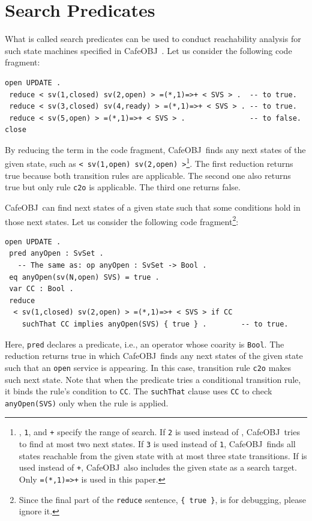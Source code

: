 \documentclass[12pt]{report}
\newcommand{\stt}[1]{{\small{\tt {#1}}}}
\newcommand{\cafeobj}{{\sf CafeOBJ}~}
\begin{document}
\section{Search Predicates}
\label{sec:searchpredicate}
What is called search predicates can be used to conduct
reachability analysis for such state machines specified in
\cafeobj. Let us consider the following code fragment:
\begin{verbatim}
open UPDATE .
 reduce < sv(1,closed) sv(2,open) > =(*,1)=>+ < SVS > .  -- to true.
 reduce < sv(3,closed) sv(4,ready) > =(*,1)=>+ < SVS > . -- to true.
 reduce < sv(5,open) > =(*,1)=>+ < SVS > .               -- to false.
close
\end{verbatim}
By reducing the term in the code fragment, \cafeobj finds any next
states of the given state, such as
\stt{<~sv(1,open)~sv(2,open)~>}\footnote{{\tt *}, {\tt 1}, and {\tt +}
  specify the range of search. If {\tt 2} is used instead of {\tt *},
  \cafeobj tries to find at most two next states. If {\tt 3} is used
  instead of {\tt 1}, \cafeobj finds all states reachable from the
  given state with at most three state transitions. If {\tt *} is used
  instead of {\tt +}, \cafeobj also includes the given state as a
  search target.  Only \stt{=(*,1)=>+} is used in this paper.}.  The
first reduction returns true because both transition rules are
applicable.  The second one also returns true but only rule {\tt c2o}
is applicable. The third one returns false.

\cafeobj can find next states of a given state such that some
conditions hold in those next states. Let us consider the following
code fragment\footnote{Since the final part of the {\tt reduce} sentence,
  {\tt \{~true~\}}, is for debugging, please ignore it.}:
\begin{verbatim}
open UPDATE .
 pred anyOpen : SvSet .
   -- The same as: op anyOpen : SvSet -> Bool .
 eq anyOpen(sv(N,open) SVS) = true .
 var CC : Bool .
 reduce 
  < sv(1,closed) sv(2,open) > =(*,1)=>+ < SVS > if CC
    suchThat CC implies anyOpen(SVS) { true } .        -- to true.
\end{verbatim}
Here, {\tt pred} declares a predicate, i.e., an operator whose coarity
is {\tt Bool}.  The reduction returns true in which \cafeobj finds any
next states of the given state such that an {\tt open} service is
appearing. In this case, transition rule {\tt c2o} makes such next
state.  Note that when the predicate tries a conditional transition
rule, it binds the rule's condition to {\tt CC}. The {\tt suchThat}
clause uses {\tt CC} to check \stt{anyOpen(SVS)} only when the rule is
applied.
\end{document}
